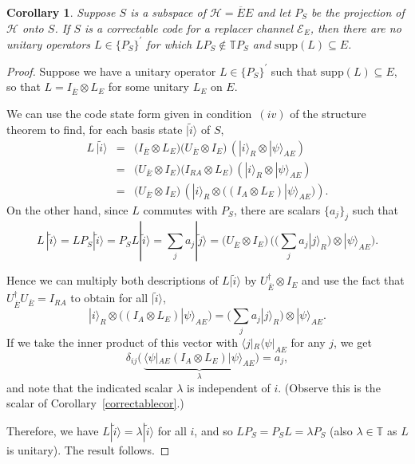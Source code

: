 \documentclass[10pt,a4paper]{amsart}
\newtheorem{cor}{Corollary}
\def\bra#1{\langle #1 |}
\def\ket#1{| #1 \rangle}
\begin{document}
\begin{cor}\label{cleaninglemma}
Suppose $S$ is a subspace of $\mathcal H = \overline{E} E$ and let $P_S$ be the projection of $\mathcal H$ onto $S$. If $S$ is a correctable code for a replacer channel $\mathcal E_E$, then there are no unitary operators $L\in \{ P_S \}^\prime$ for which $L P_S \notin \mathbb{T} P_S$ and $\mathrm{supp}(L)\subseteq E$.
\end{cor}

\begin{proof}
Suppose we have a unitary operator $L\in \{ P_S \}^\prime$ such that $\mathrm{supp}(L)\subseteq E$, so that $L = I_{\overline{E}} \otimes L_E$ for some unitary $L_E$ on $E$. 

We can use the code state form given in condition~$(iv)$ of the structure theorem to find, for each basis state $ \ket{\widetilde{i}}$ of $S$, 
\begin{eqnarray*}
 L  \, \ket{\widetilde{i}} &=& \big( I_{\overline{E}} \otimes L_E \big) \big( U_{\overline{E}} \otimes I_E \big) \, ( \ket{i}_R \otimes \ket{\psi}_{A E}) \\ 
 &=&  \big( U_{\overline{E}} \otimes I_E \big) \big( I_{RA} \otimes L_E \big) \, ( \ket{i}_R \otimes \ket{\psi}_{A E}) \\ 
  &=&  \big( U_{\overline{E}} \otimes I_E \big) \, ( \ket{i}_R \otimes \big( ( I_{A} \otimes L_E   ) \ket{\psi}_{A E}\big) ) . 
\end{eqnarray*}
On the other hand, since $L$ commutes with $P_S$, there are scalars $\{a_j\}_j$ such that 
\[
L  \, \ket{\widetilde{i}} = L P_S \ket{\widetilde{i}} = P_S L   \ket{\widetilde{i}} = \sum_j a_j  \ket{\widetilde{j}} = \big( U_{\overline{E}} \otimes I_E \big) \, \big( \big( \sum_j a_j \ket{j}_R \big) \otimes \ket{\psi}_{A E} \big).  
\]

Hence we can multiply both descriptions of $L\ket{\widetilde{i}}$ by $U_{\overline{E}}^\dagger \otimes I_E$ and use the fact that $U_{\overline{E}}^\dagger U_{\overline{E}} = I_{RA}$ to obtain for all $ \ket{\widetilde{i}}$, 
\[
\ket{i}_R \otimes \big( ( I_{A} \otimes L_E   ) \ket{\psi}_{A E}\big) = 
\Big( \sum_j a_j \ket{j}_R \Big) \otimes \ket{\psi}_{A E} . 
\]
If we take the inner product of this vector with $\bra{j}_R\bra{\psi}_{AE}$ for any $j$, we get 
\[
\delta_{ij} \big( \,   \underbrace{\bra{\psi}_{AE} (I_{A} \otimes L_E   ) \ket{\psi}_{A E}}_{\lambda} \big) = a_j, 
\]
and note that the indicated scalar $\lambda$ is independent of $i$. (Observe this is the scalar of Corollary~\ref{correctablecor}.) 

Therefore,  we have $L \ket{\widetilde{i}} = \lambda \ket{\widetilde{i}}$ for all $i$, and so $LP_S = P_S L = \lambda P_S$ (also $\lambda\in\mathbb{T}$ as $L$ is unitary). The result follows.  
\end{proof}
\end{document}

